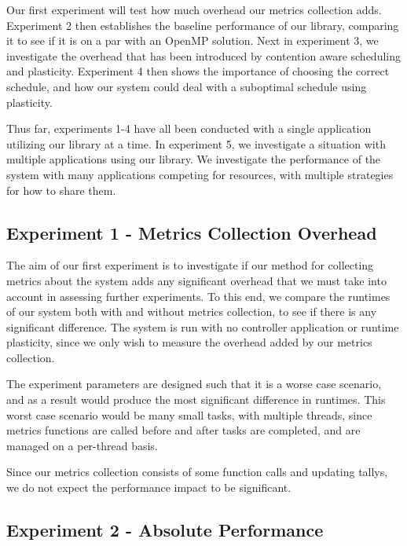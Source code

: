 Our first experiment will test how much overhead our metrics collection adds. Experiment 2 then establishes the baseline performance of our library, comparing it to see if it is on a par with an OpenMP solution. Next in experiment 3, we investigate the overhead that has been introduced by contention aware scheduling and plasticity. Experiment 4 then shows the importance of choosing the correct schedule, and how our system could deal with a suboptimal schedule using plasticity.

Thus far, experiments 1-4 have all been conducted with a single application utilizing our library at a time. In experiment 5, we investigate a situation with multiple applications using our library. We investigate the performance of the system with many applications competing for resources, with multiple strategies for how to share them.



\subsection{Experiment 1 - Metrics Collection Overhead}

The aim of our first experiment is to investigate if our method for collecting metrics about the system adds any significant overhead that we must take into account in assessing further experiments. To this end, we compare the runtimes of our system both with and without metrics collection, to see if there is any significant difference. The system is run with no controller application or runtime plasticity, since we only wish to measure the overhead added by our metrics collection. 

The experiment parameters are designed such that it is a worse case scenario, and as a result would produce the most significant difference in runtimes. This worst case scenario would be many small tasks, with multiple threads, since metrics functions are called before and after tasks are completed, and are managed on a per-thread basis.

Since our metrics collection consists of some function calls and updating tallys, we do not expect the performance impact to be significant. 





\subsection{Experiment 2 - Absolute Performance}

